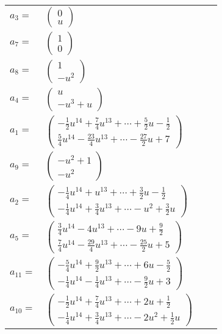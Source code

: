 \documentclass[1p]{elsarticle_modified}
\theoremstyle{definition}
\begin{document}
\begin{tabular}{m{7pt} m{180pt} m{7pt} m{180pt} }
\flushright $a_{3}=$&$\begin{pmatrix}0\\u\end{pmatrix}$ \\
\flushright $a_{7}=$&$\begin{pmatrix}1\\0\end{pmatrix}$ \\
\flushright $a_{8}=$&$\begin{pmatrix}1\\- u^2\end{pmatrix}$ \\
\flushright $a_{4}=$&$\begin{pmatrix}u\\- u^3+u\end{pmatrix}$ \\
\flushright $a_{1}=$&$\begin{pmatrix}-\frac{1}{2} u^{14}+\frac{7}{4} u^{13}+\cdots+\frac{5}{2} u-\frac{1}{2}\\\frac{5}{4} u^{14}-\frac{23}{4} u^{13}+\cdots-\frac{27}{2} u+7\end{pmatrix}$ \\
\flushright $a_{9}=$&$\begin{pmatrix}- u^2+1\\- u^2\end{pmatrix}$ \\
\flushright $a_{2}=$&$\begin{pmatrix}-\frac{1}{4} u^{14}+u^{13}+\cdots+\frac{3}{2} u-\frac{1}{2}\\-\frac{1}{4} u^{14}+\frac{3}{4} u^{13}+\cdots- u^2+\frac{3}{2} u\end{pmatrix}$ \\
\flushright $a_{5}=$&$\begin{pmatrix}\frac{3}{4} u^{14}-4 u^{13}+\cdots-9 u+\frac{9}{2}\\\frac{7}{4} u^{14}-\frac{29}{4} u^{13}+\cdots-\frac{25}{2} u+5\end{pmatrix}$ \\
\flushright $a_{11}=$&$\begin{pmatrix}-\frac{5}{4} u^{14}+\frac{9}{2} u^{13}+\cdots+6 u-\frac{5}{2}\\-\frac{1}{4} u^{14}-\frac{1}{4} u^{13}+\cdots-\frac{9}{2} u+3\end{pmatrix}$ \\
\flushright $a_{10}=$&$\begin{pmatrix}-\frac{1}{2} u^{14}+\frac{7}{4} u^{13}+\cdots+2 u+\frac{1}{2}\\-\frac{1}{4} u^{14}+\frac{3}{4} u^{13}+\cdots-2 u^2+\frac{1}{2} u\end{pmatrix}$ \\

\end{tabular}
\end{document}
